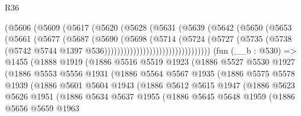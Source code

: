 \begin{lexlean}{R36}
\begin{coremodule}
                            (@5606
                              (@5609
                                (@5617
                                  (@5620
                                    (@5628
                                      (@5631
                                        (@5639
                                          (@5642
                                            (@5650
                                              (@5653
                                                (@5661
                                                  (@5677
                                                    (@5687
                                                      (@5690
                                                        (@5698
                                                          (@5714
                                                            (@5724
                                                              (@5727
                                                                (@5735
                                                                  (@5738
                                                                    (@5742
                                                                      @5744
                                                                      @1397
                                                                      @536)))))))))))))))))))))))))))))))))
    (fun (__b : @530) =>
    @1455
      (@1888
        @1919
        (@1886
          @5516
          @5519
          @1923
          (@1886
            @5527
            @5530
            @1927
            (@1886
              @5553
              @5556
              @1931
              (@1886
                @5564
                @5567
                @1935
                (@1886
                  @5575
                  @5578
                  @1939
                  (@1886
                    @5601
                    @5604
                    @1943
                    (@1886
                      @5612
                      @5615
                      @1947
                      (@1886
                        @5623
                        @5626
                        @1951
                        (@1886
                          @5634
                          @5637
                          @1955
                          (@1886
                            @5645
                            @5648
                            @1959
                            (@1886
                              @5656
                              @5659
                              @1963

\end{coremodule}
\end{lexlean}
